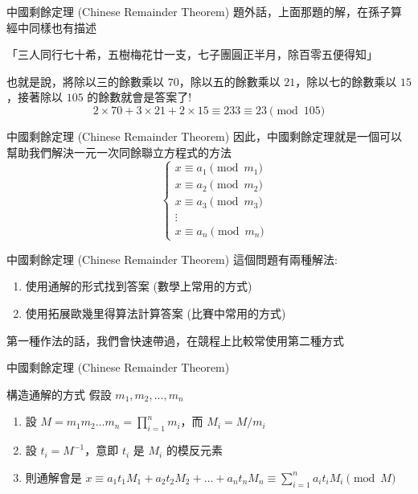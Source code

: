\documentclass[aspectratio=169]{beamer}
\begin{document}
\begin{frame}{中國剩餘定理 (Chinese Remainder Theorem)}
    題外話，上面那題的解，在孫子算經中同樣也有描述
    \begin{center}
        「三人同行七十希，五樹梅花廿一支，七子團圓正半月，除百零五便得知」
    \end{center}
    也就是說，將除以三的餘數乘以 $70$，除以五的餘數乘以 $21$，除以七的餘數乘以 $15$，接著除以 $105$ 的餘數就會是答案了! \\
    $$2 \times 70 + 3 \times 21 + 2 \times 15 \equiv 233 \equiv 23 \pmod {105}$$
\end{frame}

\begin{frame}{中國剩餘定理 (Chinese Remainder Theorem)}
    因此，中國剩餘定理就是一個可以幫助我們解決一元一次同餘聯立方程式的方法
    \begin{equation*}
        \quad \left\{ \begin{matrix} x \equiv a_1 \pmod {m_1} \\ x \equiv a_2 \pmod {m_2} \\ x \equiv a_3 \pmod {m_3} \\ \vdots \\ x \equiv a_n \pmod {m_n} \end{matrix} \right.
    \end{equation*}
\end{frame}

\begin{frame}{中國剩餘定理 (Chinese Remainder Theorem)}
    這個問題有兩種解法:
    \begin{enumerate}
        \item 使用通解的形式找到答案 (數學上常用的方式)
        \item 使用拓展歐幾里得算法計算答案 (比賽中常用的方式)
    \end{enumerate}
    第一種作法的話，我們會快速帶過，在競程上比較常使用第二種方式
\end{frame}

\begin{frame}{中國剩餘定理 (Chinese Remainder Theorem)}
    \begin{alertblock}{構造通解的方式}
        假設 $m_1, m_2, \dots, m_n$ 
        \begin{enumerate}
            \item 設 $M = m_1 m_2 \dots m_n = \prod_{i=1}^n m_i$，而 $M_i = M/m_i$
            \item 設 $t_i = M^{-1}$，意即 $t_i$ 是 $M_i$ 的模反元素  
            \item 則通解會是 $x \equiv a_1t_1M_1 + a_2t_2M_2 + \dots + a_n t_n M_n \equiv \sum_{i=1}^n a_i t_i M_i \pmod M$
        \end{enumerate}
    \end{alertblock}
\end{frame}
\end{document}
